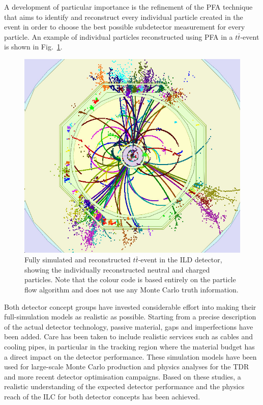 \documentclass[%
 reprint,
 amsmath,amssymb,
 aps,
]{revtex4-1}
\def\Fig#1{Fig.~\ref{#1}}
\begin{document}
A development of particular importance is the refinement of the 
PFA technique  that aims to identify
and reconstruct
 every individual particle created in the event
 in order to choose the best possible subdetector measurement for every particle. 
An example of individual particles reconstructed using PFA 
 in a $t\bar t$-event is shown in \Fig{fig:ttbarevent}.
\begin{figure}
\begin{center}
\includegraphics[width=0.85\hsize]{figures/ttbar_event_ILD.jpg}
\end{center}
\caption{Fully simulated and reconstructed $t\bar t$-event in the ILD
  detector, showing the individually reconstructed neutral and charged
  particles. Note that the colour code is based entirely on the
  particle flow algorithm 
and does not use any Monte Carlo truth information.}
\label{fig:ttbarevent}
\vspace{-0.7cm}
\end{figure}

Both detector concept groups have invested considerable effort into 
making their full-simulation models as realistic as possible.
Starting from a precise description of the actual 
detector technology, passive material, gaps and imperfections have been added.
Care has been taken to include realistic services such as cables and 
cooling pipes, in particular in the tracking region where
the material budget has a direct impact on the detector performance.
These simulation models have been used for large-scale Monte Carlo
production
 and physics analyses for the TDR and more recent detector optimisation
campaigns. Based on these studies, a 
realistic understanding of the expected detector performance and the physics
reach of the ILC for both detector concepts has been
achieved.
\end{document}
